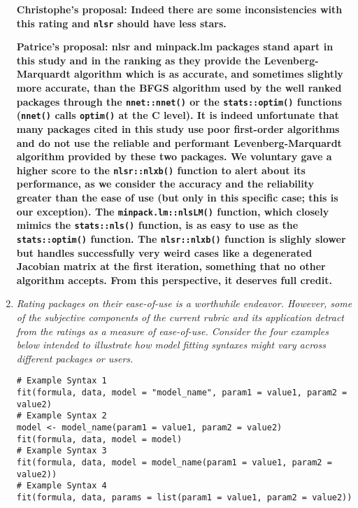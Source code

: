 \documentclass[12pt]{article}
\newcommand{\pkg}{\textbf}
\newcommand{\code}{\texttt}
\begin{document}
\begin{enumerate}
\textbf{Christophe's proposal: 
Indeed there are some inconsistencies with this rating and \code{nlsr} should have less stars.}

\pkg{Patrice's proposal: 
\pkg{nlsr} and \pkg{minpack.lm} packages stand apart in this study and in the ranking as they provide 
the Levenberg-Marquardt algorithm which is as accurate, and sometimes slightly more accurate, than 
the BFGS algorithm used by the well ranked packages through the \code{nnet::nnet()} or the 
\code{stats::optim()} functions (\code{nnet()} calls \code{optim()} at the C level). 
It is indeed unfortunate that many packages cited in this study use poor first-order algorithms and do not 
use the reliable and performant Levenberg-Marquardt algorithm provided by these two packages. 
We voluntary gave a higher score to the \code{nlsr::nlxb()} function to alert about its performance, 
as we consider the accuracy and the reliability greater than the ease of use (but only in this specific case; this is our exception). 
The \code{minpack.lm::nlsLM()} function, which closely mimics the \code{stats::nls()} function, is as easy 
to use as the \code{stats::optim()} function. The \code{nlsr::nlxb()} function is slighly slower but handles 
successfully very weird cases like a degenerated Jacobian matrix at the first iteration, something that 
no other algorithm accepts. From this perspective, it deserves full credit. 
}


\item \textit{Rating packages on their ease-of-use is a worthwhile endeavor.  However, some of the subjective components of the current rubric and its application detract from the ratings as a measure of ease-of-use.  Consider the four examples below intended to illustrate how model fitting syntaxes might vary across different packages or users.
}

\begin{verbatim}
# Example Syntax 1
fit(formula, data, model = "model_name", param1 = value1, param2 = value2)
# Example Syntax 2
model <- model_name(param1 = value1, param2 = value2)
fit(formula, data, model = model)
# Example Syntax 3
fit(formula, data, model = model_name(param1 = value1, param2 = value2))
# Example Syntax 4
fit(formula, data, params = list(param1 = value1, param2 = value2))
\end{verbatim}


\end{enumerate}
\end{document}

